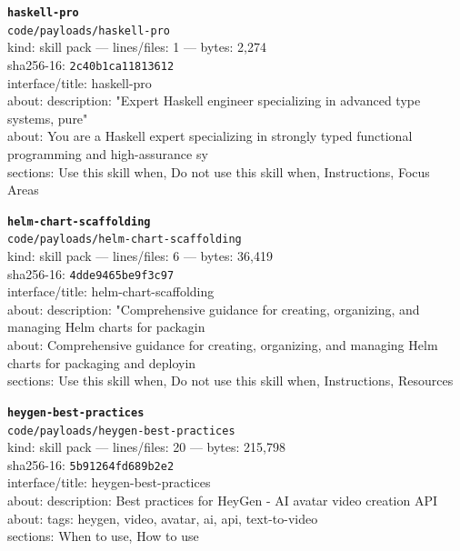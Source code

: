 \noindent\textbf{\texttt{haskell-pro}}\\
\texttt{code/payloads/haskell-pro}\\
kind: skill pack --- lines/files: 1 --- bytes: 2,274\\
sha256-16: \texttt{2c40b1ca11813612}\\
interface/title: haskell-pro\\
about: description: "Expert Haskell engineer specializing in advanced type systems, pure"\\
about: You are a Haskell expert specializing in strongly typed functional programming and high-assurance sy\\
sections: Use this skill when, Do not use this skill when, Instructions, Focus Areas\\
\vspace*{6.0pt}
\newpage

\noindent\textbf{\texttt{helm-chart-scaffolding}}\\
\texttt{code/payloads/helm-chart-scaffolding}\\
kind: skill pack --- lines/files: 6 --- bytes: 36,419\\
sha256-16: \texttt{4dde9465be9f3c97}\\
interface/title: helm-chart-scaffolding\\
about: description: "Comprehensive guidance for creating, organizing, and managing Helm charts for packagin\\
about: Comprehensive guidance for creating, organizing, and managing Helm charts for packaging and deployin\\
sections: Use this skill when, Do not use this skill when, Instructions, Resources\\
\vspace*{6.0pt}

\noindent\textbf{\texttt{heygen-best-practices}}\\
\texttt{code/payloads/heygen-best-practices}\\
kind: skill pack --- lines/files: 20 --- bytes: 215,798\\
sha256-16: \texttt{5b91264fd689b2e2}\\
interface/title: heygen-best-practices\\
about: description: Best practices for HeyGen - AI avatar video creation API\\
about: tags: heygen, video, avatar, ai, api, text-to-video\\
sections: When to use, How to use\\
\vspace*{6.0pt}

